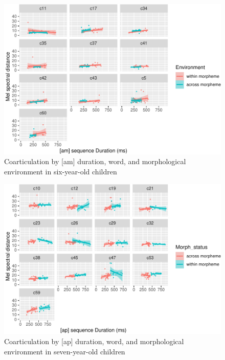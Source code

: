 \documentclass[
]{article}
\begin{document}
\begin{figure}
\centering
\includegraphics{3_ch3_results_files/figure-latex/six-facet-am-1.pdf}
\caption{\label{fig:six-facet-am}Coarticulation by {[}am{]} duration, word, and morphological environment in six-year-old children}
\end{figure}

\begin{figure}
\centering
\includegraphics{3_ch3_results_files/figure-latex/seven-facet-ap-1.pdf}
\caption{\label{fig:seven-facet-ap}Coarticulation by {[}ap{]} duration, word, and morphological environment in seven-year-old children}
\end{figure}
\end{document}

